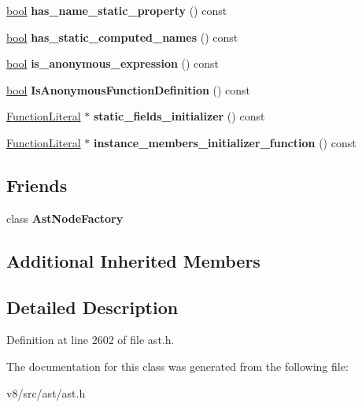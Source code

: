 \begin{DoxyCompactItemize}
\mbox{\hyperlink{classbool}{bool}} {\bfseries has\+\_\+name\+\_\+static\+\_\+property} () const
\item 
\mbox{\label{classv8_1_1internal_1_1ClassLiteral_a1768524f3f02a0b307bbf42650c17985}} 
\mbox{\hyperlink{classbool}{bool}} {\bfseries has\+\_\+static\+\_\+computed\+\_\+names} () const
\item 
\mbox{\label{classv8_1_1internal_1_1ClassLiteral_afec08dce6b91c0309dd9f643b4bf44e5}} 
\mbox{\hyperlink{classbool}{bool}} {\bfseries is\+\_\+anonymous\+\_\+expression} () const
\item 
\mbox{\label{classv8_1_1internal_1_1ClassLiteral_a75a6eda5423128f0d95fe5a8bc76786e}} 
\mbox{\hyperlink{classbool}{bool}} {\bfseries Is\+Anonymous\+Function\+Definition} () const
\item 
\mbox{\label{classv8_1_1internal_1_1ClassLiteral_a62c9736aa382cf913e60d1815bb3b5e6}} 
\mbox{\hyperlink{classv8_1_1internal_1_1FunctionLiteral}{Function\+Literal}} $\ast$ {\bfseries static\+\_\+fields\+\_\+initializer} () const
\item 
\mbox{\label{classv8_1_1internal_1_1ClassLiteral_addc653e95d4188848b078aa65b0efdc4}} 
\mbox{\hyperlink{classv8_1_1internal_1_1FunctionLiteral}{Function\+Literal}} $\ast$ {\bfseries instance\+\_\+members\+\_\+initializer\+\_\+function} () const
\end{DoxyCompactItemize}
\subsection*{Friends}
\begin{DoxyCompactItemize}
\item 
\mbox{\label{classv8_1_1internal_1_1ClassLiteral_a8d587c8ad3515ff6433eb83c578e795f}} 
class {\bfseries Ast\+Node\+Factory}
\end{DoxyCompactItemize}
\subsection*{Additional Inherited Members}


\subsection{Detailed Description}


Definition at line 2602 of file ast.\+h.



The documentation for this class was generated from the following file\+:\begin{DoxyCompactItemize}
\item 
v8/src/ast/ast.\+h\end{DoxyCompactItemize}
